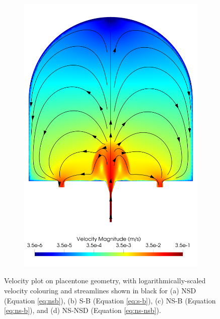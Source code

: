 \begin{figure}
\begin{subfigure}[b]{0.45\textwidth}
            \includegraphics[width=\textwidth]{diagrams/results-modelling/velocity-transport/meshandsoln_dg_velocity_placentone_ns-nsb_velocity-log.png}
            \caption{}
        \end{subfigure}
        \caption{Velocity plot on placentone geometry, with logarithmically-scaled velocity colouring and streamlines shown in black for (a) NSD (Equation \eqref{eq:nsb}), (b) S-B (Equation \eqref{eq:s-b}), (c) NS-B (Equation \eqref{eq:ns-b}), and (d) NS-NSD (Equation \eqref{eq:ns-nsb}).}
    \end{figure}


